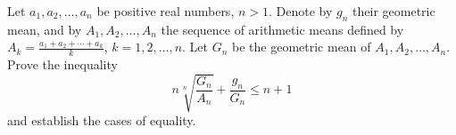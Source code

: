 Let $a_1, a_2, \ldots, a_n$ be positive real numbers, $n > 1$. Denote by $g_n$ their geometric mean, and by $A_1, A_2, \ldots, A_n$ the sequence of arithmetic means defined by $A_k = \frac{a_1 + a_2 + \cdots + a_k}{k}$, $k = 1, 2, \ldots, n$. Let $G_n$ be the geometric mean of $A_1, A_2, \ldots, A_n$. Prove the inequality
\[ n\sqrt[n]{\frac{G_n}{A_n}} + \frac{g_n}{G_n} \leq n + 1 \]
and establish the cases of equality.
